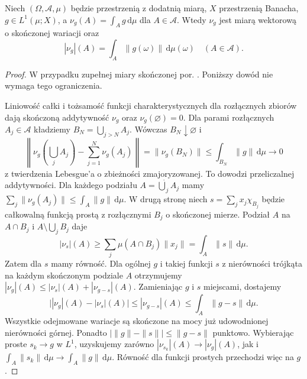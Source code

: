 \begin{twierdzenie}
Niech \label{thm:variation-density-30}$(\Omega,\mathcal A,\mu)$ będzie przestrzenią
z dodatnią miarą, $X$ przestrzenią Banacha,
$g\in L^1(\mu;X)$, a
$\nu_g(A)=\int_Ag\,\mathrm d\mu$ dla $A\in\mathcal A$.
Wtedy $\nu_g$ jest miarą wektorową o skończonej wariacji
oraz
\[
 |\nu_g|(A)=\int_A\|g(\omega)\|\,\mathrm d\mu(\omega)
 \quad(A\in\mathcal A).
\]
\end{twierdzenie}
\begin{proof}
W przypadku zupełnej miary skończonej por. . Poniższy dowód nie wymaga tego ograniczenia.

Liniowość całki i tożsamość funkcji charakterystycznych
dla rozłącznych zbiorów dają skończoną addytywność
$\nu_g$ oraz $\nu_g(\varnothing)=0$. Dla parami
rozłącznych $A_j\in\mathcal A$ kładziemy
$B_N=\bigcup_{j>N}A_j$. Wówczas $B_N\downarrow\varnothing$
i
\[
 \left\|\nu_g\left(\bigcup_jA_j\right)
 -\sum_{j=1}^N\nu_g(A_j)\right\|
 =\|\nu_g(B_N)\|
 \le\int_{B_N}\|g\|\,\mathrm d\mu\longrightarrow0
\]
z twierdzenia Lebesgue'a o zbieżności zmajoryzowanej.
To dowodzi przeliczalnej addytywności.
Dla każdego podziału $A=\dot\bigcup_jA_j$ mamy
$\sum_j\|\nu_g(A_j)\|\le\int_A\|g\|\,\mathrm d\mu$.
W drugą stronę niech $s=\sum_jx_j\chi_{B_j}$
będzie całkowalną funkcją prostą z rozłącznymi $B_j$
o skończonej mierze. Podział $A$ na $A\cap B_j$
i $A\setminus\bigcup_j B_j$ daje
\[
 |\nu_s|(A)\ge\sum_j\mu(A\cap B_j)\|x_j\|
 =\int_A\|s\|\,\mathrm d\mu.
\]
Zatem dla $s$ mamy równość. Dla ogólnej $g$
i takiej funkcji $s$ z nierówności trójkąta na
każdym skończonym podziale $A$ otrzymujemy
$|\nu_g|(A)\le|\nu_s|(A)+|\nu_{g-s}|(A)$.
Zamieniając $g$ i $s$ miejscami, dostajemy
\[
 \big||\nu_g|(A)-|\nu_s|(A)\big|
 \le|\nu_{g-s}|(A)\le\int_A\|g-s\|\,\mathrm d\mu.
\]
Wszystkie odejmowane wariacje są skończone na mocy
już udowodnionej nierówności górnej.
Ponadto $|\|g\|-\|s\||\le\|g-s\|$ punktowo.
Wybierając proste $s_k\to g$ w $L^1$, uzyskujemy
zarówno $|\nu_{s_k}|(A)\to|\nu_g|(A)$, jak i
$\int_A\|s_k\|\,\mathrm d\mu\to\int_A\|g\|\,\mathrm d\mu$.
Równość dla funkcji prostych przechodzi więc na $g$.
\end{proof}

